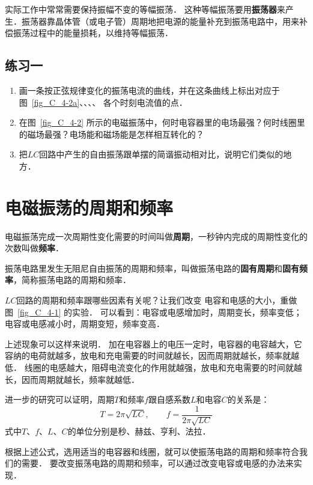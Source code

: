 实际工作中常常需要保持振幅不变的等幅振荡．
这种等幅振荡要用\textbf{振荡器}来产生．振荡器靠晶体管（或电子管）周期地把电源的能量补充到振荡电路中，用来补偿振荡过程中的能量损耗，以维持等幅振荡．

\subsection*{练习一}
\begin{enumerate}
    \item 画一条按正弦规律变化的振荡电流的曲线，并在这条曲线上标出对应于图~\ref{fig_C_4-2a}、、、、 各个时刻电流值的点．
    \item 在图~\ref{fig_C_4-2} 所示的电磁振荡中，何时电容器里的电场最强？何时线圈里的磁场最强？电场能和磁场能是怎样相互转化的？
    \item 把$LC$回路中产生的自由振荡跟单摆的简谐振动相对比，说明它们类似的地方．
\end{enumerate}


\section{电磁振荡的周期和频率}
电磁振荡完成一次周期性变化需要的时间叫做\textbf{周期}，一秒钟内完成的周期性变化的次数叫做\textbf{频率}．

振荡电路里发生无阻尼自由振荡的周期和频率，叫做振荡电路的\textbf{固有周期}和\textbf{固有频率}，简称振荡电路的周期和频率．

$LC$回路的周期和频率跟哪些因素有关呢？让我们改变
电容和电感的大小，重做图~\ref{fig_C_4-1} 的实验．
可以看到：电容或电感增加时，周期变长，频率变低；电容或电感减小时，周期变短，频率变高．

上述现象可以这样来说明．
加在电容器上的电压一定时，电容器的电容越大，它容纳的电荷就越多，放电和充电需要的时间就越长，因而周期就越长，频率就越低．
线圈的电感越大，阻碍电流变化的作用就越强，放电和充电需要的时间就越长，因而周期就越长，频率就越低．

进一步的研究可以证明，周期$T$和频率$f$跟自感系数$L$和电容$C$的关系是：
\[T=2\pi\sqrt{LC},\qquad f=\frac{1}{2\pi\sqrt{LC}} \]
式中$T$、$f$、$L$、$C$的单位分别是秒、赫兹、亨利、法拉．

根据上述公式，选用适当的电容器和线圈，就可以使振荡电路的周期和频率符合我们的需要．
要改变振荡电路的周期和频率，可以通过改变电容或电感的办法来实现．

